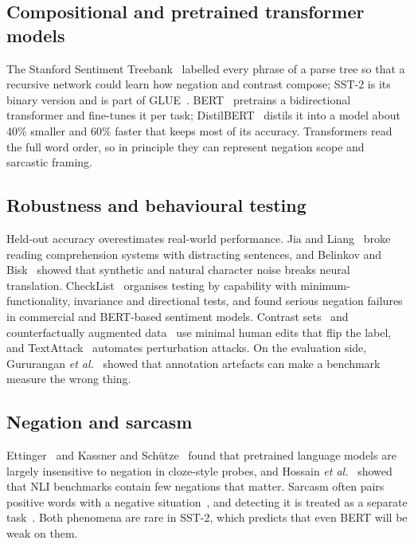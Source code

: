 \documentclass[conference]{IEEEtran}
\begin{document}
\subsection{Compositional and pretrained transformer models}
The Stanford Sentiment Treebank~\cite{socher2013} labelled every phrase of a parse tree so that a
recursive network could learn how negation and contrast compose; SST-2 is its binary version and
is part of GLUE~\cite{wang2019glue}. BERT~\cite{devlin2019} pretrains a bidirectional transformer
and fine-tunes it per task; DistilBERT~\cite{sanh2019} distils it into a model about 40\% smaller
and 60\% faster that keeps most of its accuracy. Transformers read the full word order, so in
principle they can represent negation scope and sarcastic framing.

\subsection{Robustness and behavioural testing}
Held-out accuracy overestimates real-world performance. Jia and Liang~\cite{jia2017} broke reading
comprehension systems with distracting sentences, and Belinkov and Bisk~\cite{belinkov2018} showed
that synthetic and natural character noise breaks neural translation. CheckList~\cite{ribeiro2020}
organises testing by capability with minimum-functionality, invariance and directional tests, and
found serious negation failures in commercial and BERT-based sentiment models. Contrast
sets~\cite{gardner2020} and counterfactually augmented data~\cite{kaushik2020} use minimal human
edits that flip the label, and TextAttack~\cite{morris2020} automates perturbation attacks. On the
evaluation side, Gururangan \emph{et al.}~\cite{gururangan2018} showed that annotation artefacts can
make a benchmark measure the wrong thing.

\subsection{Negation and sarcasm}
Ettinger~\cite{ettinger2020} and Kassner and Sch\"utze~\cite{kassner2020} found that pretrained
language models are largely insensitive to negation in cloze-style probes, and Hossain
\emph{et al.}~\cite{hossain2020} showed that NLI benchmarks contain few negations that matter.
Sarcasm often pairs positive words with a negative situation~\cite{riloff2013}, and detecting it
is treated as a separate task~\cite{joshi2017}. Both phenomena are rare in SST-2, which predicts
that even BERT will be weak on them.
\end{document}
